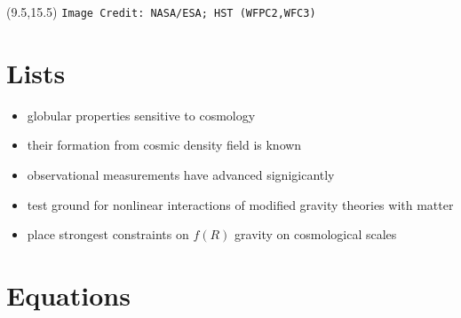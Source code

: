 \documentclass{fancyslides}
\newenvironment{typewriter}{\ttfamily}{\par}
\begin{document}
\startingslidetwo %

\begin{frame}
	\begin{typewriter}
	\begin{mybox}
		\large{\textbf{{\color{white}
		\tableofcontents
		}}}
	\end{mybox}
	\begin{textblock}{30}(9.5,15.5)
		{\color{white}\tiny{\texttt{Image Credit: NASA/ESA; HST (WFPC2,WFC3)}}}
	\end{textblock}
	\end{typewriter}
\end{frame}

\section{Lists}

\begin{frame}
	\begin{typewriter}
	\begin{itemize} %
		\item globular properties sensitive to cosmology
		\item their formation from cosmic density field is known
		\item observational measurements have advanced signigicantly
		\item test ground for nonlinear interactions of modified gravity theories with matter
		\item place strongest constraints on $f(R)$ gravity on cosmological scales
	\end{itemize}
	\end{typewriter}
\end{frame}

\section{Equations}
\end{document}
